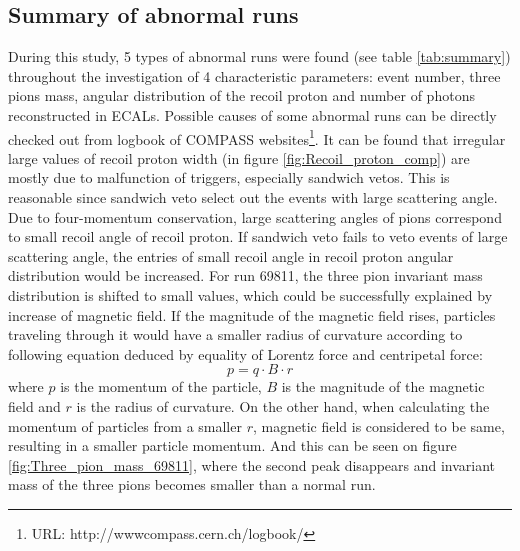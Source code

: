 \subsection{Summary of abnormal runs}
During this study, 5 types of abnormal runs were found (see table \ref{tab:summary}) throughout the investigation of 4 characteristic parameters: event number, three pions mass, angular distribution of the recoil proton and number of photons reconstructed in ECALs. Possible causes of some abnormal runs can be directly checked out from logbook of COMPASS websites\footnote[2]{URL: http://wwwcompass.cern.ch/logbook/}. It can be found that irregular large values of recoil proton width (in figure \ref{fig:Recoil_proton_comp}) are mostly due to malfunction of triggers, especially sandwich vetos. This is reasonable since sandwich veto select out the events with large scattering angle. Due to four-momentum conservation, large scattering angles of pions correspond to small recoil angle of recoil proton. If sandwich veto fails to veto events of large scattering angle, the entries of small recoil angle in recoil proton angular distribution would be increased. For run 69811, the three pion invariant mass distribution is shifted to small values, which could be successfully explained by increase of magnetic field. If the magnitude of the magnetic field rises, particles traveling through it would have a smaller radius of curvature according to following equation deduced by equality of Lorentz force and centripetal force:
\begin{equation}
p = q\cdot B\cdot r
\end{equation}
where $p$ is the momentum of the particle, $B$ is the magnitude of the magnetic field and $r$ is the radius of curvature. On the other hand, when calculating the momentum of particles from a smaller $r$, magnetic field is considered to be same, resulting in a smaller particle momentum. And this can be seen on figure \ref{fig:Three_pion_mass_69811}, where the second peak disappears and invariant mass of the three pions becomes smaller than a normal run.
